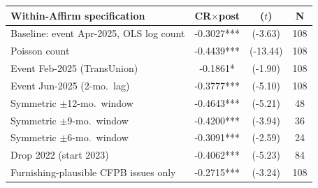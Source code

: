 \begin{tabular}{lccc}
\toprule
Within-Affirm specification & CR$\times$post & ($t$) & N \\
\midrule
Baseline: event Apr-2025, OLS log count & -0.3027*** & (-3.63) & 108 \\
Poisson count & -0.4439*** & (-13.44) & 108 \\
Event Feb-2025 (TransUnion) & -0.1861* & (-1.90) & 108 \\
Event Jun-2025 (2-mo.\ lag) & -0.3777*** & (-5.10) & 108 \\
Symmetric $\pm$12-mo.\ window & -0.4643*** & (-5.21) & 48 \\
Symmetric $\pm$9-mo.\ window & -0.4200*** & (-3.94) & 36 \\
Symmetric $\pm$6-mo.\ window & -0.3091*** & (-2.59) & 24 \\
Drop 2022 (start 2023) & -0.4062*** & (-5.23) & 84 \\
Furnishing-plausible CFPB issues only & -0.2715*** & (-3.24) & 108 \\
\bottomrule
\end{tabular}
